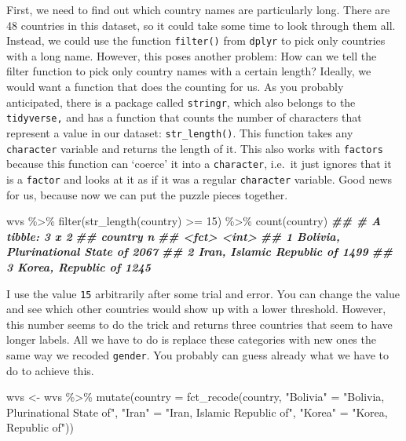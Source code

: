 \documentclass[
]{book}
\newenvironment{Shaded}{\begin{snugshade}}{\end{snugshade}}
\newcommand{\AttributeTok}[1]{\textcolor[rgb]{0.77,0.63,0.00}{#1}}
\newcommand{\DecValTok}[1]{\textcolor[rgb]{0.00,0.00,0.81}{#1}}
\newcommand{\DocumentationTok}[1]{\textcolor[rgb]{0.56,0.35,0.01}{\textbf{\textit{#1}}}}
\newcommand{\FunctionTok}[1]{\textcolor[rgb]{0.00,0.00,0.00}{#1}}
\newcommand{\NormalTok}[1]{#1}
\newcommand{\OtherTok}[1]{\textcolor[rgb]{0.56,0.35,0.01}{#1}}
\newcommand{\SpecialCharTok}[1]{\textcolor[rgb]{0.00,0.00,0.00}{#1}}
\newcommand{\StringTok}[1]{\textcolor[rgb]{0.31,0.60,0.02}{#1}}
\begin{document}
First, we need to find out which country names are particularly long. There are 48 countries in this dataset, so it could take some time to look through them all. Instead, we could use the function \texttt{filter()} from \texttt{dplyr} to pick only countries with a long name. However, this poses another problem: How can we tell the filter function to pick only country names with a certain length? Ideally, we would want a function that does the counting for us. As you probably anticipated, there is a package called \texttt{stringr}, which also belongs to the \texttt{tidyverse,} and has a function that counts the number of characters that represent a value in our dataset: \texttt{str\_length()}. This function takes any \texttt{character} variable and returns the length of it. This also works with \texttt{factors} because this function can `coerce' it into a \texttt{character}, i.e.~it just ignores that it is a \texttt{factor} and looks at it as if it was a regular \texttt{character} variable. Good news for us, because now we can put the puzzle pieces together.

\begin{Shaded}
\begin{Highlighting}[]
\NormalTok{wvs }\SpecialCharTok{\%\textgreater{}\%}
  \FunctionTok{filter}\NormalTok{(}\FunctionTok{str\_length}\NormalTok{(country) }\SpecialCharTok{\textgreater{}=} \DecValTok{15}\NormalTok{) }\SpecialCharTok{\%\textgreater{}\%}
  \FunctionTok{count}\NormalTok{(country)}
\DocumentationTok{\#\# \# A tibble: 3 x 2}
\DocumentationTok{\#\#   country                             n}
\DocumentationTok{\#\#   \textless{}fct\textgreater{}                           \textless{}int\textgreater{}}
\DocumentationTok{\#\# 1 Bolivia, Plurinational State of  2067}
\DocumentationTok{\#\# 2 Iran, Islamic Republic of        1499}
\DocumentationTok{\#\# 3 Korea, Republic of               1245}
\end{Highlighting}
\end{Shaded}

I use the value \texttt{15} arbitrarily after some trial and error. You can change the value and see which other countries would show up with a lower threshold. However, this number seems to do the trick and returns three countries that seem to have longer labels. All we have to do is replace these categories with new ones the same way we recoded \texttt{gender}. You probably can guess already what we have to do to achieve this.

\begin{Shaded}
\begin{Highlighting}[]
\NormalTok{wvs }\OtherTok{\textless{}{-}}\NormalTok{ wvs }\SpecialCharTok{\%\textgreater{}\%}
  \FunctionTok{mutate}\NormalTok{(}\AttributeTok{country =} \FunctionTok{fct\_recode}\NormalTok{(country,}
                              \StringTok{"Bolivia"} \OtherTok{=} \StringTok{"Bolivia, Plurinational State of"}\NormalTok{,}
                              \StringTok{"Iran"} \OtherTok{=} \StringTok{"Iran, Islamic Republic of"}\NormalTok{,}
                              \StringTok{"Korea"} \OtherTok{=} \StringTok{"Korea, Republic of"}\NormalTok{))}
\end{Highlighting}
\end{Shaded}
\end{document}
